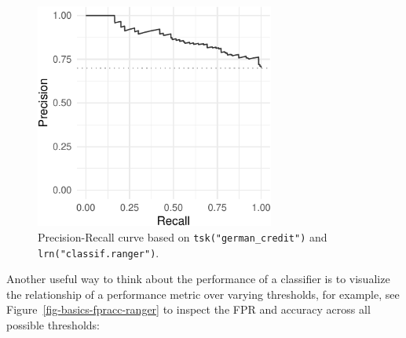 \begin{Shaded}
\begin{Highlighting}[]
 \NormalTok{)}
\end{Highlighting}
\end{Shaded}

\begin{figure}

{\centering \includegraphics[width=0.7\textwidth,height=\textheight]{chapters/chapter3/evaluation_and_benchmarking_files/figure-pdf/fig-basics-prc-ranger-1.pdf}

}

\caption{\label{fig-basics-prc-ranger}Precision-Recall curve based on
\texttt{tsk("german\_credit")} and \texttt{lrn("classif.ranger")}.}

\end{figure}

Another useful way to think about the performance of a classifier is to
visualize the relationship of a performance metric over varying
thresholds, for example, see Figure~\ref{fig-basics-fpracc-ranger} to
inspect the FPR and accuracy across all possible thresholds:

\begin{Shaded}
\begin{Highlighting}[]
 \NormalTok{, } \NormalTok{(}\NormalTok{))}
 \NormalTok{, } \NormalTok{(}\NormalTok{))}
\end{Highlighting}
\end{Shaded}

